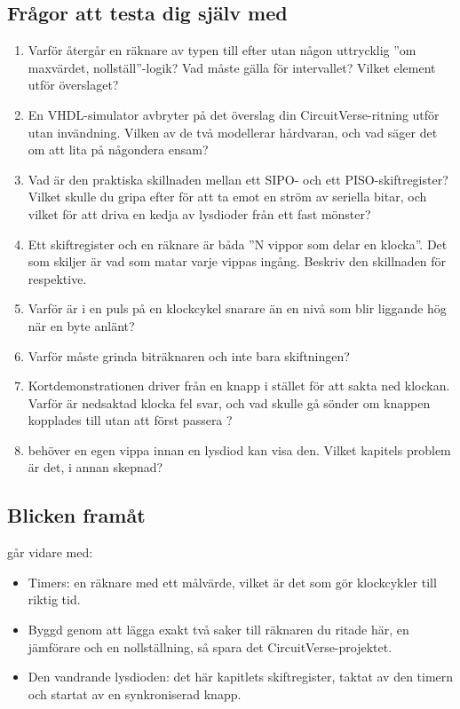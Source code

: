 \subsection*{Frågor att testa dig själv med}
\begin{enumerate}
  \item Varför återgår en räknare av typen  till  efter
     utan någon uttrycklig ”om maxvärdet, nollställ”-logik? Vad måste gälla för
    intervallet? Vilket element utför överslaget?
  \item En VHDL-simulator avbryter på det överslag din CircuitVerse-ritning utför utan invändning.
    Vilken av de två modellerar hårdvaran, och vad säger det om att lita på någondera ensam?
  \item Vad är den praktiska skillnaden mellan ett SIPO- och ett PISO-skiftregister? Vilket skulle
    du gripa efter för att ta emot en ström av seriella bitar, och vilket för att driva en kedja av
    lysdioder från ett fast mönster?
  \item Ett skiftregister och en räknare är båda ”N vippor som delar en klocka”. Det som skiljer är
    vad som matar varje vippas ingång. Beskriv den skillnaden för respektive.
  \item Varför är  i  en puls på en klockcykel snarare än en nivå
    som blir liggande hög när en byte anlänt?
  \item Varför måste  grinda biträknaren och inte bara skiftningen?
  \item Kortdemonstrationen driver  från en knapp i stället för att sakta ned
    klockan. Varför är nedsaktad klocka fel svar, och vad skulle gå sönder om knappen kopplades
    till  utan att först passera ?
  \item {} behöver en egen vippa innan en lysdiod kan visa den. Vilket kapitels
    problem är det, i annan skepnad?
\end{enumerate}

\subsection*{Blicken framåt}
 går vidare med:
\begin{itemize}
  \item Timers: en räknare med ett målvärde, vilket är det som gör klockcykler till riktig tid.
  \item Byggd genom att lägga exakt två saker till räknaren du ritade här, en jämförare och en
    nollställning, så spara det CircuitVerse-projektet.
  \item Den vandrande lysdioden: det här kapitlets skiftregister, taktat av den timern och startat
    av en synkroniserad knapp.
\end{itemize}
